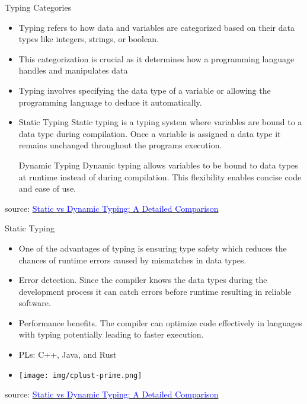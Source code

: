 \documentclass{beamer}
\begin{document}
\begin{frame}[t]{Typing Categories}
	\scriptsize
	\begin{itemize}
		\item<1-> Typing refers to how data and variables are categorized based on their data types like integers, strings, or boolean.
		\item<2-> This categorization is crucial as it determines how a programming language handles and manipulates data
		\item<3-> Typing involves specifying the data type of a variable or allowing the programming language to deduce it automatically.
		\item<4->[]
			\begin{block}{Static Typing}
				Static typing is a typing system where variables are bound to a data type during compilation. Once a variable is assigned a data type it remains unchanged throughout the programs execution.
			\end{block}
			\begin{block}{Dynamic Typing}
				Dynamic typing allows variables to be bound to data types at runtime instead of during compilation. This flexibility enables concise code and ease of use.
			\end{block}
	\end{itemize}
	
	\tiny source: \href{https://www.bairesdev.com/blog/static-vs-dynamic-typing/} {\textcolor{blue}{Static vs Dynamic Typing: A Detailed Comparison}} 	
\end{frame}

\begin{frame}[t]{Static Typing}
	\scriptsize
	\begin{itemize}
		\item<1-> One of the advantages of typing is ensuring type safety which reduces the chances of runtime errors caused by mismatches in data types.
		\item<2-> Error detection. Since the compiler knows the data types during the development process it can catch errors before runtime resulting in reliable software.
		\item<3-> Performance benefits. The compiler can optimize code effectively in languages with typing potentially leading to faster execution.
		\item<4-> PLs: C++, Java, and Rust
		\item<5->[]
		\begin{center}
			\texttt{[image: img/cplust-prime.png]}
		\end{center}	
	\end{itemize}
	
	\tiny source: \href{https://www.bairesdev.com/blog/static-vs-dynamic-typing/} {\textcolor{blue}{Static vs Dynamic Typing: A Detailed Comparison}} 	
\end{frame}
\end{document}
